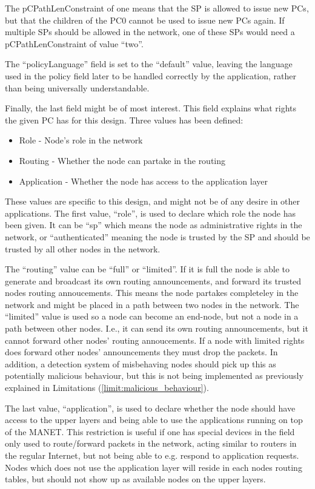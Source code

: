 The pCPathLenConstraint of one means that the \ac{SP} is allowed to issue new
\acp{PC}, but that the children of the \ac{PC0} cannot be used to issue new
\acp{PC} again. If multiple \acp{SP} should be allowed in the network, one of
these \acp{SP} would need a pCPathLenConstraint of value ``two''.

The ``policyLanguage'' field is set to the ``default'' value, leaving the
language used in the policy field later to be handled correctly by the
application, rather than being universally understandable.

Finally, the last field might be of most interest. This field explains what
rights the given \ac{PC} has for this design. Three values has been defined:

\begin{itemize}
  \item Role - Node's role in the network
  \item Routing - Whether the node can partake in the routing
  \item Application - Whether the node has access to the application layer
\end{itemize}

These values are specific to this design, and might not be of any desire in
other applications. The first value, ``role'', is used to declare which role the
node has been given. It can be ``sp'' which means the node as administrative
rights in the network, or ``authenticated'' meaning the node is trusted by the
\ac{SP} and should be trusted by all other nodes in the network.

The ``routing'' value can be ``full'' or ``limited''. If it is full the node is
able to generate and broadcast its own routing announcements, and forward its
trusted nodes routing annoucements. This means the node partakes completeley in
the network and might be placed in a path between two nodes in the network. The
``limited'' value is used so a node can become an end-node, but not a node in a
path between other nodes. I.e., it can send its own routing announcements, but
it cannot forward other nodes' routing annoucements. If a node with limited
rights does forward other nodes' announcements they must drop the packets. In
addition, a detection system of misbehaving nodes should pick up this as
potentially malicious behaviour, but this is not being implemented as previously
explained in Limitations (\ref{limit:malicious_behaviour}).

The last value, ``application'', is used to declare whether the node should have
access to the upper layers and being able to use the applications running on top
of the \ac{MANET}. This restriction is useful if one has special devices in the
field only used to route/forward packets in the network, acting similar to
routers in the regular Internet, but not being able to e.g. respond to
application requests. Nodes which does not use the application layer will reside
in each nodes routing tables, but should not show up as available nodes on the
upper layers.

